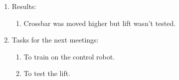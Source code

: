 \begin{enumerate}
\begin{enumerate}
	\end{enumerate}
	
	\item Results:
	\begin{enumerate}
		
		\item Crossbar was moved higher but lift wasn't tested.
		
	\end{enumerate}
	
	\item Tasks for the next meetings:
	\begin{enumerate}
		
		\item To train on the control robot.
		
		\item To test the lift.
			
	\end{enumerate}
\end{enumerate}
\fillpage
